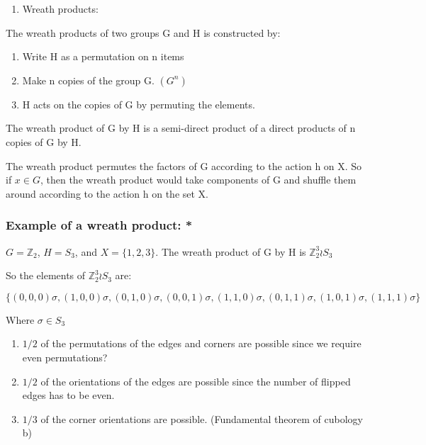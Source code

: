 \begin{enumerate}
\def\labelenumi{\arabic{enumi}.}
\setcounter{enumi}{2}
\tightlist
\item
  Wreath products:
\end{enumerate}

The wreath products of two groups G and H is constructed by:

\begin{enumerate}
\def\labelenumi{\arabic{enumi}.}
\item
  Write H as a permutation on n items
\item
  Make n copies of the group G. \((G^n)\)
\item
  H acts on the copies of G by permuting the elements.
\end{enumerate}

The wreath product of G by H is a semi-direct product of a direct
products of n copies of G by H.

The wreath product permutes the factors of G according to the action h
on X. So if \(x \in G\), then the wreath product would take components
of G and shuffle them around according to the action h on the set X.

\subsubsection{Example of a wreath product:
*}\label{example-of-a-wreath-product}

\(G = \mathbb Z_2\), \(H = S_3\), and \(X = \{1,2,3\}\). The wreath
product of G by H is \(\mathbb Z_2^3 \wr S_3\)

So the elements of \(\mathbb Z_2^3 \wr S_3\) are:

\[\{(0,0,0)\sigma,(1,0,0)\sigma,(0,1,0)\sigma,(0,0,1)\sigma,(1,1,0)\sigma,(0,1,1)\sigma,(1,0,1)\sigma,(1,1,1)\sigma\}\]

Where \(\sigma \in S_3\)

\begin{enumerate}
\def\labelenumi{\arabic{enumi}.}
\item
  \(1/2\) of the permutations of the edges and corners are possible
  since we require even permutations?
\item
  \(1/2\) of the orientations of the edges are possible since the number
  of flipped edges has to be even.
\item
  \(1/3\) of the corner orientations are possible. (Fundamental theorem
  of cubology b)
\end{enumerate}

